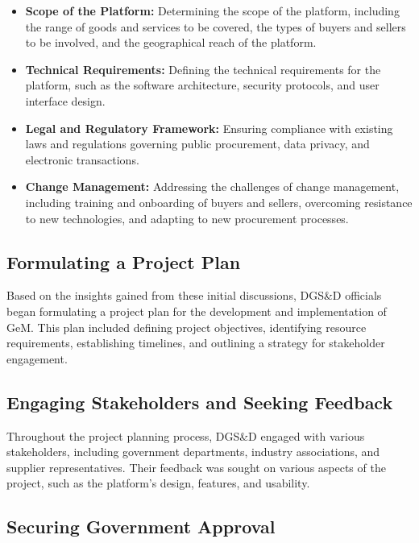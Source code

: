 \begin{itemize}
    \item \textbf{Scope of the Platform:} Determining the scope of the platform, including the range of goods and services to be covered, the types of buyers and sellers to be involved, and the geographical reach of the platform.
    
    \item \textbf{Technical Requirements:} Defining the technical requirements for the platform, such as the software architecture, security protocols, and user interface design.
    
    \item \textbf{Legal and Regulatory Framework:} Ensuring compliance with existing laws and regulations governing public procurement, data privacy, and electronic transactions.
    
    \item \textbf{Change Management:} Addressing the challenges of change management, including training and onboarding of buyers and sellers, overcoming resistance to new technologies, and adapting to new procurement processes.
\end{itemize}

\subsection{Formulating a Project Plan}

Based on the insights gained from these initial discussions, DGS\&D officials began formulating a project plan for the development and implementation of GeM. This plan included defining project objectives, identifying resource requirements, establishing timelines, and outlining a strategy for stakeholder engagement.

\subsection{Engaging Stakeholders and Seeking Feedback}

Throughout the project planning process, DGS\&D engaged with various stakeholders, including government departments, industry associations, and supplier representatives. Their feedback was sought on various aspects of the project, such as the platform's design, features, and usability.

\subsection{Securing Government Approval}

